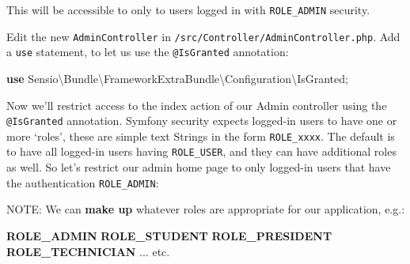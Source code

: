 \documentclass[a4paperpaper,openright]{book}
\newenvironment{Shaded}{}{}
\newcommand{\AnnotationTok}[1]{\textcolor[rgb]{0.38,0.63,0.69}{\textbf{\textit{#1}}}}
\newcommand{\CommentTok}[1]{\textcolor[rgb]{0.38,0.63,0.69}{\textit{#1}}}
\newcommand{\KeywordTok}[1]{\textcolor[rgb]{0.00,0.44,0.13}{\textbf{#1}}}
\newcommand{\NormalTok}[1]{#1}
\newcommand{\OtherTok}[1]{\textcolor[rgb]{0.00,0.44,0.13}{#1}}
\newcommand{\StringTok}[1]{\textcolor[rgb]{0.25,0.44,0.63}{#1}}
\begin{document}
This will be accessible to only to users logged in with
\texttt{ROLE\_ADMIN} security.

Edit the new \texttt{AdminController} in
\texttt{/src/Controller/AdminController.php}. Add a \texttt{use}
statement, to let us use the \texttt{@IsGranted} annotation:

\begin{Shaded}
\begin{Highlighting}[]
    \KeywordTok{use}\NormalTok{ Sensio\textbackslash{}Bundle\textbackslash{}FrameworkExtraBundle\textbackslash{}Configuration\textbackslash{}IsGranted}\OtherTok{;}
\end{Highlighting}
\end{Shaded}

Now we'll restrict access to the index action of our Admin controller
using the \texttt{@IsGranted} annotation. Symfony security expects
logged-in users to have one or more `roles', these are simple text
Strings in the form \texttt{ROLE\_xxxx}. The default is to have all
logged-in users having \texttt{ROLE\_USER}, and they can have additional
roles as well. So let's restrict our admin home page to only logged-in
users that have the authentication \texttt{ROLE\_ADMIN}:

\begin{Shaded}
\end{Shaded}

NOTE: We can \textbf{make up} whatever roles are appropriate for our
application, e.g.:

\begin{Shaded}
\begin{Highlighting}[]
    \KeywordTok{ROLE_ADMIN}
    \KeywordTok{ROLE_STUDENT}
    \KeywordTok{ROLE_PRESIDENT}
    \KeywordTok{ROLE_TECHNICIAN}
    \StringTok{...}\NormalTok{ etc. }
\end{Highlighting}
\end{Shaded}
\end{document}
